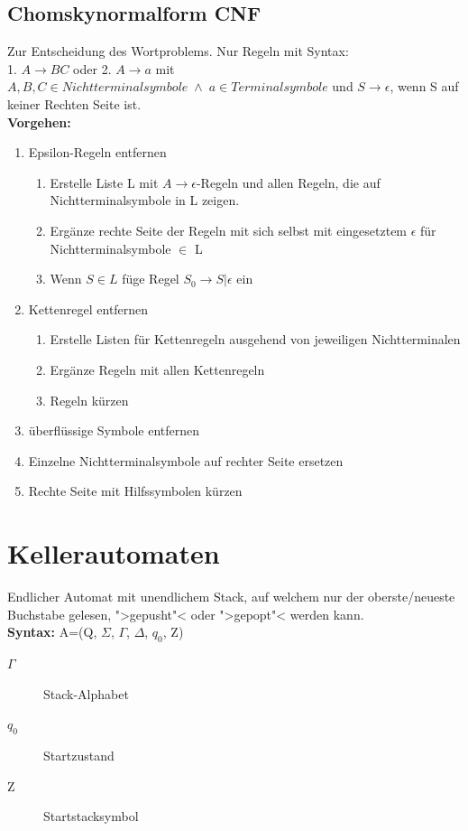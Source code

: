 \documentclass[12pt,a4paper]{article}
\begin{document}
	\subsection{Chomskynormalform CNF}
	Zur Entscheidung des Wortproblems. Nur Regeln mit Syntax: \\
	1. $A \rightarrow BC$ oder 2. $A \rightarrow a$ mit $A,B,C \in Nichtterminalsymbole \; \wedge \; a \in Terminalsymbole$ und $S \rightarrow \epsilon$, wenn S auf keiner Rechten Seite ist.\\
	\textbf{Vorgehen:}
	\begin{enumerate}
		\item Epsilon-Regeln entfernen
		\begin{enumerate}
			\item Erstelle Liste L mit $A\rightarrow \epsilon$-Regeln und allen Regeln, die auf Nichtterminalsymbole in L zeigen.
			\item Ergänze rechte Seite der Regeln mit sich selbst mit eingesetztem $\epsilon$ für Nichtterminalsymbole $\in$ L
			\item Wenn $S \in L$ füge Regel $S_0 \rightarrow S | \epsilon$ ein
		\end{enumerate}
		\item Kettenregel entfernen
		\begin{enumerate}
			\item Erstelle Listen für Kettenregeln ausgehend von jeweiligen Nichtterminalen
			\item Ergänze Regeln mit allen Kettenregeln
			\item Regeln kürzen
		\end{enumerate}
		\item überflüssige Symbole entfernen
		\item Einzelne Nichtterminalsymbole auf rechter Seite ersetzen 
		\item Rechte Seite mit Hilfssymbolen kürzen
	\end{enumerate}

\section{Kellerautomaten}
	Endlicher Automat mit unendlichem Stack, auf welchem nur der oberste/neueste Buchstabe gelesen, ">gepusht"< oder ">gepopt"< werden kann.\\
	\textbf{Syntax:} A=(Q, $\Sigma$, $\Gamma$, $\Delta$, $q_0$, Z)
	\begin{description}
		\item[$\Gamma$] Stack-Alphabet
		\item[$q_0$] Startzustand
		\item[Z] Startstacksymbol  
	\end{description}
\end{document}
